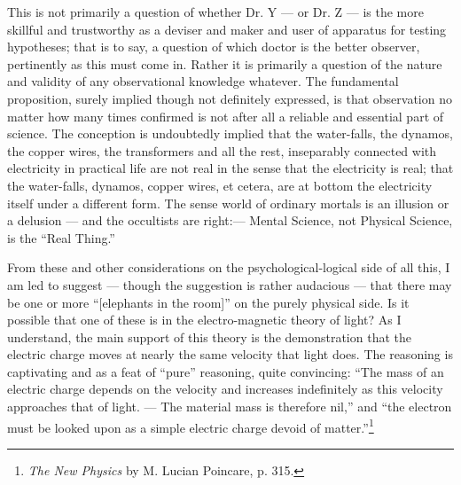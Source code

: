 \documentclass[a4paper, 11pt, oneside, polutonikogreek, english]{article}
\begin{document}
This is not primarily a question of whether Dr. Y --- or Dr. Z --- is the more skillful and trustworthy as a deviser and maker and user of apparatus for testing hypotheses; that is to say, a question of which doctor is the better observer, pertinently as this must come in. Rather it is primarily a question of the nature and validity of any observational knowledge whatever. The fundamental proposition, surely implied though not definitely expressed, is that observation no matter how many times confirmed is not after all a reliable and essential part of science. The conception is undoubtedly implied that the water-falls, the dynamos, the copper wires, the transformers and all the rest, inseparably connected with electricity in practical life are not real in the sense that the electricity is real; that the water-falls, dynamos, copper wires, et cetera, are at bottom the electricity itself under a different form. The sense world of ordinary mortals is an illusion or a delusion --- and the occultists are right:--- Mental Science, not Physical Science, is the ``Real Thing.''

From these and other considerations on the psychological-logical side of all this, I am led to suggest --- though the suggestion is rather audacious --- that there may be one or more ``[elephants in the room]'' on the purely physical side. Is it possible that one of these is in the electro-magnetic theory of light? As I understand, the main support of this theory is the demonstration that the electric charge moves at nearly the same velocity that light does. The reasoning is captivating and as a feat of ``pure'' reasoning, quite convincing: ``The mass of an electric charge depends on the velocity and increases indefinitely as this velocity approaches that of light. --- The material mass is therefore nil,'' and ``the electron must be looked upon as a simple electric charge devoid of matter.''\footnote{\emph{The New Physics} by M. Lucian Poincare, p. 315.}
\end{document}

